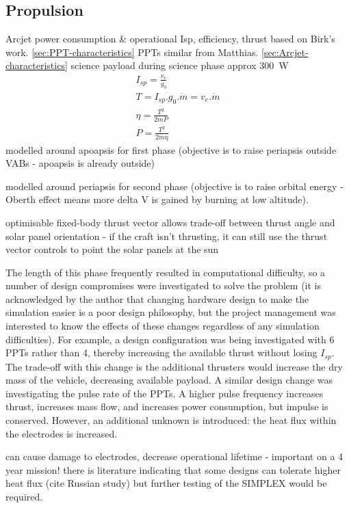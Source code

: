 \subsection{Propulsion}
Arcjet power consumption \& operational Isp, efficiency, thrust based on Birk's work. \autoref{sec:PPT-characteristics}
PPTs similar from Matthias. \autoref{sec:Arcjet-characteristics}
science payload during science phase approx 300~W \parencite{web_BW-1}
\begin{gather}
I_{sp} = \frac{v_e}{g_0} \\
T = I_{sp}.g_0.\dot{m} = v_e.\dot{m} \\
\eta = \frac{T^2}{2\dot{m}P} \\
P = \frac{T^2}{2\dot{m}\eta} 
\end{gather}
modelled around apoapsis for first phase (objective is to raise periapsis outside VABs - apoapsis is already outside)

modelled around periapsis for second phase (objective is to raise orbital energy - Oberth effect means more delta V is gained by burning at low altitude).

optimisable fixed-body thrust vector allows trade-off between thrust angle and solar panel orientation - if the craft isn't thrusting, it can still use the thrust vector controls to point the solar panels at the sun


The length of this phase frequently resulted in computational difficulty, so a number of design compromises were investigated to solve the problem (it is acknowledged by the author that changing hardware design to make the simulation easier is a poor design philosophy, but the project management was interested to know the effects of these changes regardless of any simulation difficulties). For example, a design configuration was being investigated with 6 PPTs rather than 4, thereby increasing the available thrust without losing $I_{sp}$. The trade-off with this change is the additional thrusters would increase the dry mass of the vehicle, decreasing available payload. A similar design change was investigating the pulse rate of the PPTs. A higher pulse frequency increases thrust, increases mass flow, and increases power consumption, but impulse is conserved. However, an additional unknown is introduced: the heat flux within the electrodes is increased. 

can cause damage to electrodes, decrease operational lifetime - important on a 4 year mission! there is literature indicating that some designs can tolerate higher heat flux (cite Russian study) but further testing of the SIMPLEX would be required.


